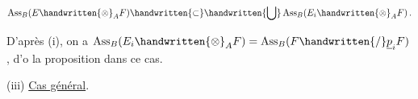 \[
\operatorname{Ass}_B(E\handwritten{\otimes}_A F)\handwritten{\subset}\handwritten{\bigcup}\operatorname{Ass}_B(E_i\handwritten{\otimes}_A F)\,.
\]

D'après (i), on a $\operatorname{Ass}_B(E_i\handwritten{\otimes}_A F)=\operatorname{Ass}_B(F\handwritten{/}\underline p_i F)$, d'o la proposition dans ce cas.

(iii) \uline{Cas général}.

